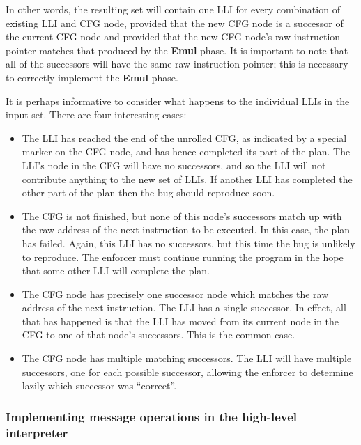 In other words, the resulting set will contain one LLI for every
combination of existing LLI and CFG node, provided that the new CFG
node is a successor of the current CFG node and provided that the new
CFG node's raw instruction pointer matches that produced by the
\textbf{Emul} phase.  It is important to note that all of the
successors will have the same raw instruction pointer; this is
necessary to correctly implement the \textbf{Emul} phase.

It is perhaps informative to consider what happens to the individual
LLIs in the input set.  There are four interesting cases:

\begin{itemize}
\item The LLI has reached the end of the unrolled CFG, as indicated by
  a special marker on the CFG node, and has hence completed its part
  of the plan.  The LLI's node in the CFG will have no successors, and
  so the LLI will not contribute anything to the new set of LLIs.  If
  another LLI has completed the other part of the plan then the bug
  should reproduce soon.

\item The CFG is not finished, but none of this node's successors
  match up with the raw address of the next instruction to be
  executed.  In this case, the plan has failed.  Again, this LLI has
  no successors, but this time the bug is unlikely to reproduce.  The
  enforcer must continue running the program in the hope that some
  other LLI will complete the plan.

\item The CFG node has precisely one successor node which matches the
  raw address of the next instruction.  The LLI has a single
  successor.  In effect, all that has happened is that the LLI has
  moved from its current node in the CFG to one of that node's
  successors.  This is the common case.

\item The CFG node has multiple matching successors.  The LLI will
  have multiple successors, one for each possible successor, allowing
  the enforcer to determine lazily which successor was ``correct''.
\end{itemize}

\subsubsection{Implementing message operations in the high-level interpreter}
\label{sect:enforce:hli_messages}

